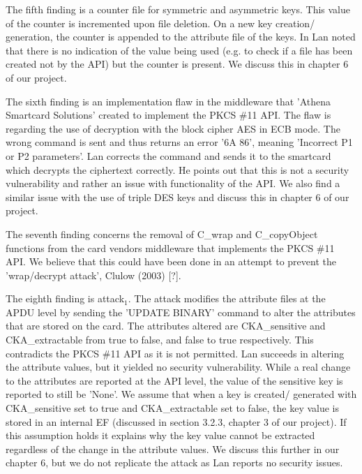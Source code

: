\documentclass[bsc,frontabs,twoside,singlespacing,parskip,deptreport]{infthesis}     %
\begin{document}
The fifth finding is a counter file for symmetric and asymmetric keys. This value of the counter is incremented upon file deletion. On a new key creation/ generation, the counter is appended to the attribute file of the keys. In Lan noted that there is no indication of the value being used (e.g. to check if a file has been created not by the API) but the counter is present. We discuss this in chapter 6 of our project.

The sixth finding is an implementation flaw in the middleware that 'Athena Smartcard Solutions' created to implement the PKCS \#11 API. The flaw is regarding the use of decryption with the block cipher AES in ECB mode. The wrong command is sent and thus returns an error '6A 86', meaning 'Incorrect P1 or P2 parameters'. Lan corrects the command and sends it to the smartcard which decrypts the ciphertext correctly. He points out that this is not a security vulnerability and rather an issue with functionality of the API. We also find a similar issue with the use of triple DES keys and discuss this in chapter 6 of our project. 

The seventh finding concerns the removal of C\_wrap and C\_copyObject functions from the card vendors middleware that implements the PKCS \#11 API. We believe that this could have been done in an attempt to prevent the 'wrap/decrypt attack', Clulow (2003) [?].

The eighth finding is attack$_1$. The attack modifies the attribute files at the APDU level by sending the 'UPDATE BINARY' command to alter the attributes that are stored on the card. The attributes altered are CKA\_sensitive and CKA\_extractable from true to false, and false to true respectively. This contradicts the PKCS \#11 API as it is not permitted. Lan succeeds in altering the attribute values, but it yielded no security vulnerability. While a real change to the attributes are reported at the API level, the value of the sensitive key is reported to still be 'None'. We assume that when a key is created/ generated with CKA\_sensitive set to true and CKA\_extractable set to false, the key value is stored in an internal EF (discussed in section 3.2.3, chapter 3 of our project). If this assumption holds it explains why the key value cannot be extracted regardless of the change in the attribute values. We discuss this further in our chapter 6, but we do not replicate the attack as Lan reports no security issues.
\end{document}
